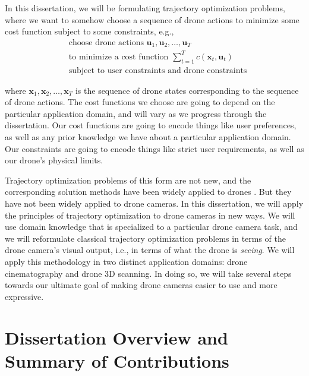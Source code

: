 \noindent In this dissertation, we will be formulating trajectory optimization problems, where we want to somehow choose a sequence of drone actions to minimize some cost function subject to some constraints, e.g.,
~
\begin{equation*}
\begin{aligned}
& \text{choose drone actions } \mathbf{u}_1, \mathbf{u}_2, \ldots, \mathbf{u}_T\\
& \text{to minimize a cost function } \sum_{t=1}^T c( \mathbf{x}_t, \mathbf{u}_t)\\
& \text{subject to user constraints and drone constraints}
\end{aligned}
\end{equation*}

\noindent where $\mathbf{x}_1, \mathbf{x}_2, \ldots, \mathbf{x}_T$ is the sequence of drone states corresponding to the sequence of drone actions.
The cost functions we choose are going to depend on the particular application domain, and will vary as we progress through the dissertation.
Our cost functions are going to encode things like user preferences, as well as any prior knowledge we have about a particular application domain.
Our constraints are going to encode things like strict user requirements, as well as our drone's physical limits.

Trajectory optimization problems of this form are not new, and the corresponding solution methods have been widely applied to drones \cite{kumar:2012}.
But they have not been widely applied to drone cameras.
In this dissertation, we will apply the principles of trajectory optimization to drone cameras in new ways.
We will use domain knowledge that is specialized to a particular drone camera task, and we will reformulate classical trajectory optimization problems in terms of the drone camera's visual output, i.e., in terms of what the drone is \emph{seeing}.
We will apply this methodology in two distinct application domains: drone cinematography and drone 3D scanning.
In doing so, we will take several steps towards our ultimate goal of making drone cameras easier to use and more expressive.

\section{Dissertation Overview and Summary of Contributions}

